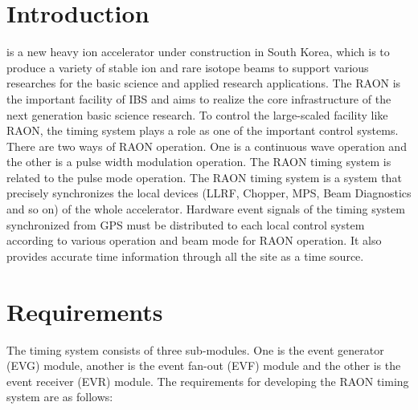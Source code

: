 \documentclass[journal]{IEEEtran}
\begin{document}
\section{Introduction}
% 
% 
% 
% 

 is a new heavy ion accelerator under construction in South Korea, which is to produce a variety of stable ion and rare isotope beams to support various researches for the basic science and applied research applications\cite{risp}. The RAON is the important facility of IBS and aims to realize the core infrastructure of the next generation basic science research. To control the large-scaled facility like RAON, the timing system plays a role as one of the important control systems. There are two ways of RAON operation. One is a continuous wave operation and the other is a pulse width modulation operation. The RAON timing system is related to the pulse mode operation. The RAON timing system is a system that precisely synchronizes the local devices (LLRF, Chopper, MPS, Beam Diagnostics and so on) of the whole accelerator. Hardware event signals of the timing system synchronized from GPS must be distributed to each local control system according to various operation and beam mode for RAON operation. It also provides accurate time information through all the site as a time source.

\section{Requirements}
The timing system consists of three sub-modules. One is the event generator (EVG) module, another is the event fan-out (EVF) module and the other is the event receiver (EVR) module.
The requirements for developing the RAON timing system are as follows:
\end{document}
